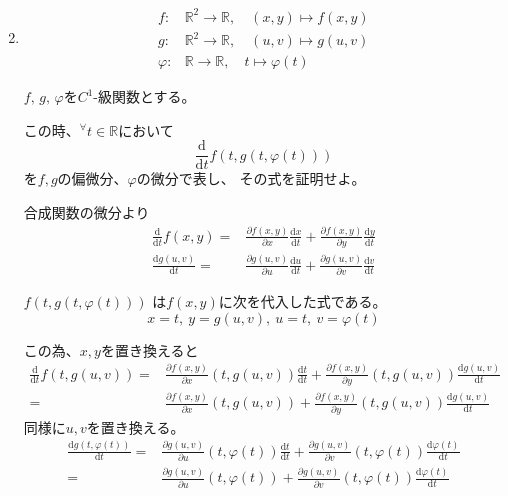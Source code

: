 \documentclass[12pt,b5paper]{ltjsarticle}
\begin{document}
\begin{enumerate}
 \setcounter{enumi}{1}
 \item
      \begin{align}
       f:& \mathbb{R}^2 \rightarrow \mathbb{R}, \quad (x,y) \mapsto f(x,y)\\
       g:& \mathbb{R}^2 \rightarrow \mathbb{R}, \quad (u,v) \mapsto g(u,v)\\
       \varphi:& \mathbb{R} \rightarrow \mathbb{R}, \quad t \mapsto \varphi(t)
      \end{align}

      $f,\,g,\,\varphi$を$C^1$-級関数とする。

      この時、${}^{\forall}t\in\mathbb{R}$において
      \begin{equation}
       \frac{\mathrm{d}}{\mathrm{d}t}f(t,g(t,\varphi(t)))
      \end{equation}
      を$f,g$の偏微分、$\varphi$の微分で表し、
      その式を証明せよ。

      \dotfill

      合成関数の微分より
      \begin{align}
       \frac{\mathrm{d}}{\mathrm{d}t}f(x,y)
        =& \frac{\partial f(x,y)}{\partial x}\frac{\mathrm{d}x}{\mathrm{d}t}
        + \frac{\partial f(x,y)}{\partial y}\frac{\mathrm{d}y}{\mathrm{d}t}\\
       \frac{\mathrm{d}g(u,v)}{\mathrm{d}t}
        =& \frac{\partial g(u,v)}{\partial u}\frac{\mathrm{d}u}{\mathrm{d}t}
        + \frac{\partial g(u,v)}{\partial v}\frac{\mathrm{d}v}{\mathrm{d}t}
      \end{align}

      $f(t,g(t,\varphi(t)))$
      は$f(x,y)$に次を代入した式である。
      \begin{equation}
       x=t,\ y=g(u,v),\ u=t,\ v=\varphi (t)
      \end{equation}

      この為、$x,y$を置き換えると
      \begin{align}
       \frac{\mathrm{d}}{\mathrm{d}t}f(t,g(u,v))
        =& \frac{\partial f(x,y)}{\partial x}(t,g(u,v))\frac{\mathrm{d}t}{\mathrm{d}t}
        + \frac{\partial f(x,y)}{\partial y}(t,g(u,v))\frac{\mathrm{d}g(u,v)}{\mathrm{d}t}\\
       =& \frac{\partial f(x,y)}{\partial x}(t,g(u,v))
        + \frac{\partial f(x,y)}{\partial y}(t,g(u,v))\frac{\mathrm{d}g(u,v)}{\mathrm{d}t}
       \label{a}
      \end{align}
      同様に$u,v$を置き換える。
      \begin{align}
       \frac{\mathrm{d}g(t,\varphi(t))}{\mathrm{d}t}
        =& \frac{\partial g(u,v)}{\partial u}(t,\varphi(t))\frac{\mathrm{d}t}{\mathrm{d}t}
        + \frac{\partial g(u,v)}{\partial v}(t,\varphi(t))\frac{\mathrm{d}\varphi (t)}{\mathrm{d}t}\\
        =& \frac{\partial g(u,v)}{\partial u}(t,\varphi(t))
        + \frac{\partial g(u,v)}{\partial v}(t,\varphi(t))\frac{\mathrm{d}\varphi (t)}{\mathrm{d}t}
       \label{b}
      \end{align}


\end{enumerate}
\end{document}
